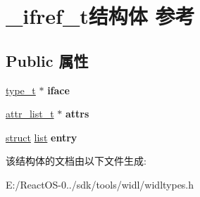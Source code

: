 \hypertarget{struct__ifref__t}{}\section{\+\_\+ifref\+\_\+t结构体 参考}
\label{struct__ifref__t}
\subsection*{Public 属性}
\begin{DoxyCompactItemize}
\item 
\mbox{\label{struct__ifref__t_a0ca1800418b0eb7dfceb238720b2b618}} 
\hyperlink{struct__type__t}{type\+\_\+t} $\ast$ {\bfseries iface}
\item 
\mbox{\label{struct__ifref__t_a479582f191ad22c66278119e1c0bae54}} 
\hyperlink{classlist}{attr\+\_\+list\+\_\+t} $\ast$ {\bfseries attrs}
\item 
\mbox{\label{struct__ifref__t_ab682f1a5138dca723f300de83806e47b}} 
\hyperlink{interfacestruct}{struct} \hyperlink{classlist}{list} {\bfseries entry}
\end{DoxyCompactItemize}


该结构体的文档由以下文件生成\+:\begin{DoxyCompactItemize}
\item 
E\+:/\+React\+O\+S-\/0../sdk/tools/widl/widltypes.\+h\end{DoxyCompactItemize}
